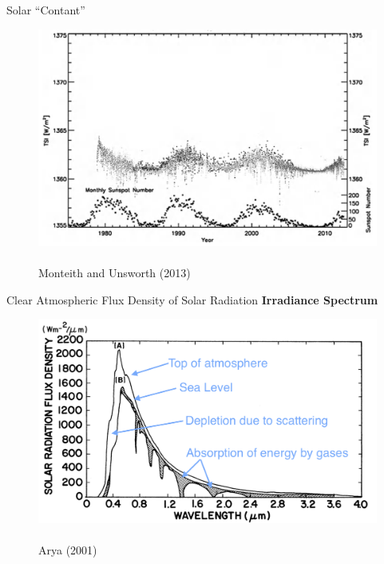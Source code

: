 
\begin{frame}{Solar ``Contant''}
\begin{figure}
	\includegraphics[width=\textwidth]{fig24.png}
	\centering \tiny~\\Monteith and Unsworth (2013)
\end{figure}
\end{frame}


\begin{frame}{Clear Atmospheric Flux Density of Solar Radiation }
\textbf{Irradiance Spectrum}
\begin{figure}
	\includegraphics[width=\textwidth]{fig26.png}
	\centering \tiny~\\Arya (2001)
\end{figure}
\end{frame}

